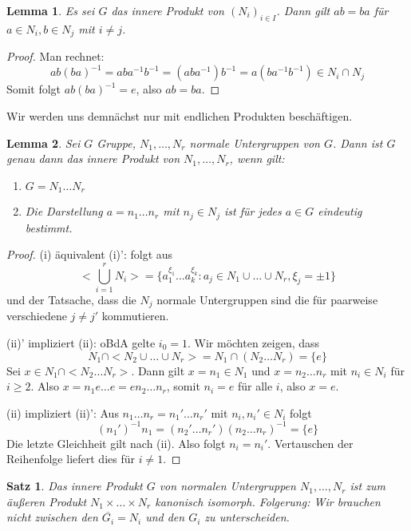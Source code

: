 \documentclass[12pt]{scrartcl}%
\newtheorem{thm}{Satz}
\newtheorem{lemma}{Lemma}
\theoremstyle{definition}
\theoremstyle{remark}
\newcommand{\inv}[1]{\left(#1\right)^{-1}}
\newcommand{\Inv}[1]{#1^{-1}}
\begin{document}
\begin{lemma}
    Es sei $G$ das innere Produkt von $(N_i)_{i\in I}$. Dann gilt $ab=ba$ für $a\in N_i, b\in N_j$ mit $i\neq j$.
\end{lemma}

\begin{proof}
    Man rechnet: $$ab\inv{ba}=ab\Inv{a}\Inv{b}=(ab\Inv{a})\Inv{b}=a(b\Inv{a}\Inv{b}) \in N_i\cap N_j$$ Somit folgt $ab\inv{ba}=e$, also $ab=ba$.
\end{proof}

Wir werden uns demnächst nur mit endlichen Produkten beschäftigen.

\begin{lemma}
    Sei $G$ Gruppe, $N_1,\dots,N_r$ normale Untergruppen von $G$. Dann ist $G$ genau dann das innere Produkt von $N_1,\dots,N_r$, wenn gilt:

    \begin{enumerate}[label=(\roman*)']
        \item $G=N_1\dots N_r$
        \item Die Darstellung $a=n_1\dots n_r$ mit $n_j\in N_j$ ist für jedes $a\in G$ eindeutig bestimmt.
    \end{enumerate}
\end{lemma}

\begin{proof}
    (i) äquivalent (i)': folgt aus $$<\bigcup_{i=1}^r N_i> = \{a_1^{\xi_1}\dots a_k^{\xi_k}: a_j\in N_1\cup\dots \cup N_r, \xi_j = \pm 1\}$$ und der Tatsache, dass die $N_j$ normale Untergruppen sind die für paarweise verschiedene $j\neq j'$ kommutieren.

    (ii)' impliziert (ii): oBdA gelte $i_0=1$. Wir möchten zeigen, dass $$N_1\cap <N_2\cup\dots \cup N_r> = N_1 \cap (N_2\dots N_r)= \{e\}$$ Sei $x\in N_1\cap <N_2\dots N_r>$. Dann gilt $x=n_1\in N_1$ und $x=n_2\dots n_r$ mit $n_i\in N_i$ für $i\geq 2$. Also $x=n_1e\dots e=en_2\dots n_r$, somit $n_i=e$ für alle $i$, also $x=e$.

    (ii) impliziert (ii)': Aus $n_1\dots n_r=n_1'\dots n_r'$ mit $n_i,n_i'\in N_i$ folgt $$\inv{n_1'}n_1=(n_2'\dots n_r')\inv{n_2\dots n_r} = \{e\}$$ Die letzte Gleichheit gilt nach (ii). Also folgt $n_i=n_i'$. Vertauschen der Reihenfolge liefert dies für $i\neq 1$.
\end{proof}

\begin{thm}
    Das innere Produkt $G$ von normalen Untergruppen $N_1,\dots,N_r$ ist zum äußeren Produkt $N_1\times\dots \times N_r$ kanonisch isomorph. Folgerung: Wir brauchen nicht zwischen den $\overline{G_i}=N_i$ und den $G_i$ zu unterscheiden.
\end{thm}
\end{document}
